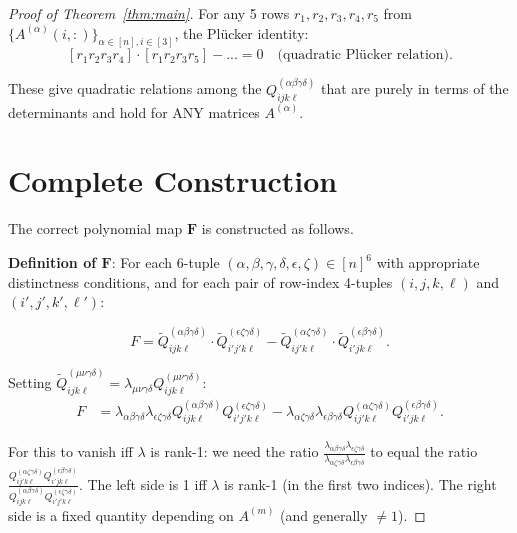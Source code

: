 \documentclass[12pt]{article}
\theoremstyle{definition}
\begin{document}
\begin{proof}[Proof of Theorem~\ref{thm:main}]
For any 5 rows $r_1,r_2,r_3,r_4,r_5$ from $\{A^{(\alpha)}(i,:)\}_{\alpha\in[n],i\in[3]}$, the Plücker identity:
$$[r_1r_2r_3r_4]\cdot[r_1r_2r_3r_5] - ... = 0 \quad\text{(quadratic Plücker relation)}.$$

These give quadratic relations among the $Q^{(\alpha\beta\gamma\delta)}_{ijk\ell}$ that are purely in terms of the determinants and hold for ANY matrices $A^{(\alpha)}$.

\section{Complete Construction}

The correct polynomial map $\mathbf{F}$ is constructed as follows.

\textbf{Definition of $\mathbf{F}$}: For each 6-tuple $(\alpha,\beta,\gamma,\delta,\epsilon,\zeta)\in[n]^6$ with appropriate distinctness conditions, and for each pair of row-index 4-tuples $(i,j,k,\ell)$ and $(i',j',k',\ell')$:

\begin{equation}\label{eq:F-final}
F = \tilde{Q}^{(\alpha\beta\gamma\delta)}_{ijk\ell}\cdot\tilde{Q}^{(\epsilon\zeta\gamma\delta)}_{i'j'k\ell} - \tilde{Q}^{(\alpha\zeta\gamma\delta)}_{ij'k\ell}\cdot\tilde{Q}^{(\epsilon\beta\gamma\delta)}_{i'jk\ell}.
\end{equation}

Setting $\tilde{Q}^{(\mu\nu\gamma\delta)}_{ijk\ell} = \lambda_{\mu\nu\gamma\delta}Q^{(\mu\nu\gamma\delta)}_{ijk\ell}$:
\begin{align*}
F &= \lambda_{\alpha\beta\gamma\delta}\lambda_{\epsilon\zeta\gamma\delta}Q^{(\alpha\beta\gamma\delta)}_{ijk\ell}Q^{(\epsilon\zeta\gamma\delta)}_{i'j'k\ell} - \lambda_{\alpha\zeta\gamma\delta}\lambda_{\epsilon\beta\gamma\delta}Q^{(\alpha\zeta\gamma\delta)}_{ij'k\ell}Q^{(\epsilon\beta\gamma\delta)}_{i'jk\ell}.
\end{align*}

For this to vanish iff $\lambda$ is rank-1: we need the ratio $\frac{\lambda_{\alpha\beta\gamma\delta}\lambda_{\epsilon\zeta\gamma\delta}}{\lambda_{\alpha\zeta\gamma\delta}\lambda_{\epsilon\beta\gamma\delta}}$ to equal the ratio $\frac{Q^{(\alpha\zeta\gamma\delta)}_{ij'k\ell}Q^{(\epsilon\beta\gamma\delta)}_{i'jk\ell}}{Q^{(\alpha\beta\gamma\delta)}_{ijk\ell}Q^{(\epsilon\zeta\gamma\delta)}_{i'j'k\ell}}$. The left side is 1 iff $\lambda$ is rank-1 (in the first two indices). The right side is a fixed quantity depending on $A^{(m)}$ (and generally $\neq 1$).


\end{proof}
\end{document}
